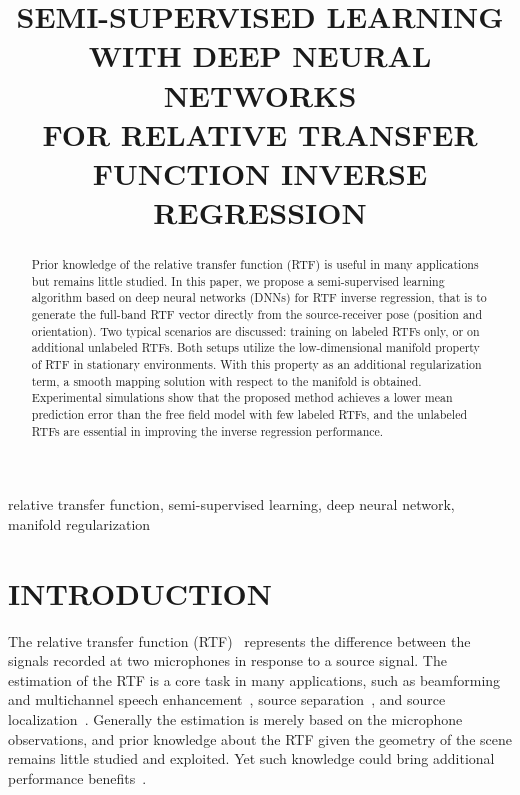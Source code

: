 \documentclass{article}
\title{SEMI-SUPERVISED LEARNING WITH DEEP NEURAL NETWORKS\\FOR RELATIVE TRANSFER FUNCTION INVERSE REGRESSION }
\begin{document}
\ninept
%
\maketitle
%
\begin{abstract}
Prior knowledge of the relative transfer function (RTF) is useful in many applications but remains little studied. In this paper, we propose a semi-supervised learning algorithm based on deep neural networks (DNNs) for RTF inverse regression, that is to generate the full-band RTF vector directly from the source-receiver pose (position and orientation). Two typical scenarios are discussed: training on labeled RTFs only, or on additional unlabeled RTFs. Both setups utilize the low-dimensional manifold property of RTF in stationary environments. With this property as an additional regularization term, a smooth mapping solution with respect to the manifold is obtained. Experimental simulations show that the proposed method achieves a lower mean prediction error than the free field model with few labeled RTFs, and the unlabeled RTFs are essential in improving the inverse regression performance.
\end{abstract}
%
\begin{keywords}
relative transfer function, semi-supervised learning, deep neural network, manifold regularization
\end{keywords}
%
\section{INTRODUCTION}
\label{sec:intro}


The relative transfer function (RTF)~\cite{gannot2001signal,cohen2004relative} represents the difference between the signals recorded at two microphones in response to a source signal. The estimation of the RTF is a core task in many applications, such as beamforming and multichannel speech enhancement~\cite{talmon2009relative,reindl2013stereo,gannot2017perspective}, source separation~\cite{araki2007underdetermined,sawada2007grouping,taseska2015relative}, and source localization~\cite{li2015estimation}. Generally the estimation is merely based on the microphone observations, and prior knowledge about the RTF given the geometry of the scene remains little studied and exploited. Yet such knowledge could bring additional performance benefits~\cite{talmon2013relative,koldovsky2013semi}.
\end{document}
